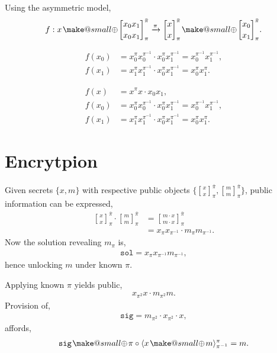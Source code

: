 \documentclass[twocolumn, aps, amsmath, amssymb, nofootinbib, superscriptaddress, longbibliography, doublefloatfix, table-of-contents, eqsecnum, rmp]{revtex4-2}
\makeatletter
\def\selfbraid#1#2#3{\langle#1\rangle_{#2}^{#3}}
\newcommand{\stackbraid}[2]{{\genfrac{[}{]}{0pt}{}{{#1}}{{#2}}}^{\bar{\pi}}_{\pi}}
\newcommand{\soplus}{{{\hspace{1pt}}{\mathbin{\mathpalette\make@small{\mathbin\oplus}}}}{\hspace{1pt}}}
\newcommand{\make@small}[2]{%
  \vcenter{\hbox{%
    \scalebox{0.6}{$\m@th#1#2$}%
  }}%
}
\makeatother
\begin{document}
Using the asymmetric model,
\begin{align}
	f: x\soplus \stackbraid{x_0 x_1}{x_0 x_1} \xrightarrow{\pi} \stackbraid{x}{x} \soplus \stackbraid{x_0}{x_1}.
\end{align}

\begin{align}
	f(x_0) &= x_0^\pi x_0^{\pi^{-1}} \cdot x_0^\pi x_1^{\pi^{-1}} = x_0^{\pi^{-1}} x_1^{\pi^{-1}},\nonumber\\
	f(x_1) &= x_1^\pi x_1^{\pi^{-1}} \cdot x_0^\pi x_1^{\pi^{-1}} = x_0^{\pi} x_1^{\pi}.
\end{align}

\begin{align}
	f(x) &= x^\pi x \cdot x_0 x_1,\nonumber\\
	f(x_0) &= x_0^\pi x_0^{\pi^{-1}} \cdot x_0^\pi x_1^{\pi^{-1}} = x_0^{\pi^{-1}} x_1^{\pi^{-1}},\nonumber\\
	f(x_1) &= x_1^\pi x_1^{\pi^{-1}} \cdot x_0^\pi x_1^{\pi^{-1}} = x_0^{\pi} x_1^{\pi}.
\end{align}

\section{Encrytpion}

Given secrets $\{x,m\}$ with respective public objects $\{\stackbraid{x}{x},\stackbraid{m}{m}\}$, public information can be expressed,
\begin{align}
	\stackbraid{x}{x} \cdot \stackbraid{m}{m} &= \stackbraid{m\cdot x}{m\cdot x} \nonumber\\
	&= x_{\pi}x_{\pi^{-1}} \cdot m_\pi m_{\pi^{-1}}.
\end{align}
Now the solution revealing $m_\pi$ is,
\begin{align}
	\mathtt{sol} = x_\pi x_{\pi^{-1}} m_{\pi^{-1}},
\end{align}
hence unlocking $m$ under known $\pi$.


Applying known $\pi$ yields public,
\begin{align}
	x_{\pi^2}x \cdot m_{\pi^2} m.
\end{align}
Provision of,
\begin{align}
	\mathtt{sig} = m_{\pi^2} \cdot x_{\pi^2} \cdot x,
\end{align}
affords,
\begin{align}
	\mathtt{sig} \soplus \pi \circ \selfbraid{x\soplus m}{\pi^{-1}}{\pi} = m.
\end{align}
\end{document}
